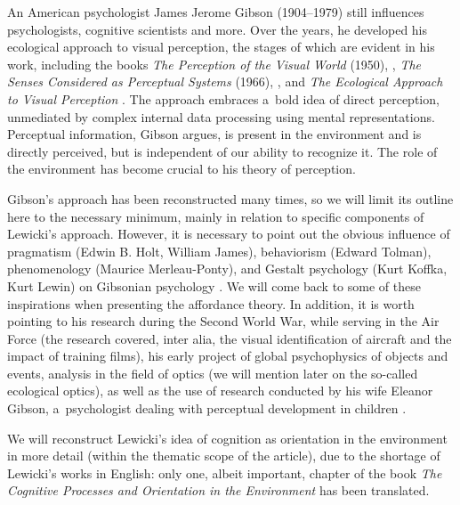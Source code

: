\documentclass[%
manuscript=article,
year=2024,
volume=77,
doi=00000.000,
]{zfn}
\begin{document}
An American psychologist James Jerome Gibson (1904–1979) still influences psychologists, cognitive scientists and more. Over the years, he developed his ecological approach to visual perception, the stages of which are evident in his work, including the books \textit{The Perception of the Visual World}
(1950),
\parencite*[][]{gibson_perception_1950},
\textit{The Senses Considered as Perceptual Systems}
(1966),
\parencite*[][]{gibson_senses_1966},
and \textit{The Ecological Approach to Visual Perception} 
\parencite*[][]{gibson_ecological_1979}. %
 The approach embraces a~bold idea of direct perception, unmediated by complex internal data processing using mental representations. Perceptual information, Gibson argues, is present in the environment and is directly perceived, but is independent of our ability to recognize it. The role of the environment has become crucial to his theory of perception.



Gibson's approach has been reconstructed many times, so we will limit its outline here to the necessary minimum, mainly in relation to specific components of Lewicki's approach. However, it is necessary to point out the obvious influence of pragmatism (Edwin B. Holt, William James), behaviorism (Edward Tolman), phenomenology (Maurice Merleau-Ponty), and Gestalt psychology (Kurt Koffka, Kurt Lewin) on Gibsonian psychology 
\parencite[see][]{lobo_history_2018}. %
 We will come back to some of these inspirations when presenting the affordance theory. In addition, it is worth pointing to his research during the Second World War, while serving in the Air Force (the research covered, inter alia, the visual identification of aircraft and the impact of training films), his early project of global psychophysics of objects and events, analysis in the field of optics (we will mention later on the so-called ecological optics), as well as the use of research conducted by his wife Eleanor Gibson, a~psychologist dealing with perceptual development in children 
\parencites[][]{gibson_principles_1969}[][]{hochberg_james_1994}[][]{heft_ecological_2001}[][]{lobo_history_2018}.%




We will reconstruct Lewicki's idea of cognition as orientation in the environment in more detail (within the thematic scope of the article), due to the shortage of Lewicki's works in English: only one, albeit important, chapter of the book \textit{The Cognitive Processes and Orientation in the Environment} 
\parencite*[][]{lewicki_cognition_2016} %
 has been translated.
\end{document}
